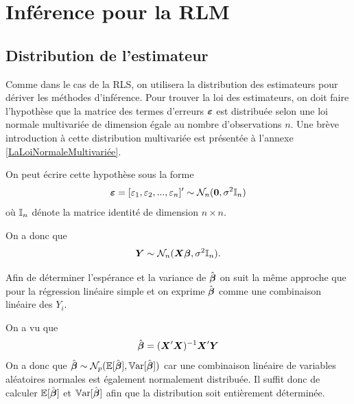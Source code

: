 \chapter{Inférence pour la RLM}
\label{sec:InferenceRLM}


\section{Distribution de l'estimateur}

Comme dans le cas de la RLS, on utilisera la distribution des estimateurs pour dériver les méthodes d'inférence.  Pour trouver la loi des estimateurs, on doit faire l'hypothèse que la matrice des termes d'erreurs $\mbox{\boldmath$\varepsilon$\unboldmath}$ est distribuée selon une loi normale multivariée de dimension égale au nombre d'observations $n$. Une brève introduction à cette distribution multivariée est présentée à l'annexe \ref{LaLoiNormaleMultivariée}.

On peut écrire cette hypothèse sous la forme
$$\mbox{\boldmath$\varepsilon$\unboldmath}=[\varepsilon_1,\varepsilon_2,...,\varepsilon_n]' \sim \mathcal{N}_n(\textbf{0}, \sigma^2\mbox{\boldmath$\mathbb{I}$\unboldmath}_n)$$
où  $\mbox{\boldmath$\mathbb{I}$\unboldmath}_n$ dénote la matrice identité de dimension $n\times n$.

On a donc que
\begin{eqnarray*}
	\mbox{\boldmath$Y$\unboldmath} \sim \mathcal{N}_n (\mbox{\boldmath$X$\unboldmath}\mbox{\boldmath$\beta$}, \sigma^2 \mbox{\boldmath$\mathbb{I}$\unboldmath}_n).
\end{eqnarray*}

Afin de déterminer l'espérance et la variance de $\hat{\mbox{\boldmath$\beta$}}$ on suit la même approche que pour la régression linéaire simple et on exprime $\hat{\mbox{\boldmath$\beta$}}$ comme une combinaison linéaire des $Y_i$.


On a vu que
\begin{eqnarray*}
	\hat{\mbox{\boldmath$\beta$}}=(\mbox{\boldmath$X$\unboldmath}'\mbox{\boldmath$X$\unboldmath})^{-1}\mbox{\boldmath$X$\unboldmath}'\mbox{\boldmath$Y$\unboldmath}
\end{eqnarray*}
On a donc que $\hat{\mbox{\boldmath$\beta$}} \sim \mathcal{N}_p(\mathbb{E}[\hat{\mbox{\boldmath$\beta$}}],\mathbb{V}\text{ar}[\hat{\mbox{\boldmath$\beta$}}])$ car une combinaison linéaire de variables aléatoires normales est également normalement distribuée. Il suffit donc de calculer $\mathbb{E}[\hat{\mbox{\boldmath$\beta$}}]$ et $\mathbb{V}\text{ar}[\hat{\mbox{\boldmath$\beta$}}]$ afin que la distribution soit entièrement déterminée.

